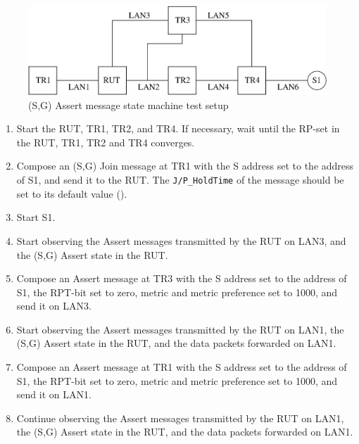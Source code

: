 \documentclass[11pt]{report}
\begin{document}
\begin{figure}[htbp]
  \begin{center}
    \includegraphics[scale=0.8]{figs/pim_test_5_1_sg_assert_message_state_machine}
    \caption{(S,G) Assert message state machine test setup}
    \label{fig:pim_test_5_1_sg_assert_message_state_machine}
  \end{center}
\end{figure}



\begin{enumerate}

  \item Start the RUT, TR1, TR2, and TR4. If necessary, wait until the RP-set
  in the RUT, TR1, TR2 and TR4 converges.

  \item Compose an (S,G) Join message at TR1 with the S address set to the
  address of S1, and send it to the RUT.
  The \verb=J/P_HoldTime= of the message should be set to its default
  value ({\PimsmJPHoldTime}).

  \item Start S1.

  \item Start observing the Assert messages transmitted by the RUT on
  LAN3, and the (S,G) Assert state in the RUT.

  \item Compose an Assert message at TR3 with the S address set to the
  address of S1, the RPT-bit set to zero, metric and metric preference set to
  1000, and send it on LAN3.

  \item Start observing the Assert messages transmitted by the RUT on
  LAN1, the (S,G) Assert state in the RUT, and the data packets forwarded on
  LAN1. 

  \item Compose an Assert message at TR1 with the S address set to the
  address of S1, the RPT-bit set to zero, metric and metric preference set to
  1000, and send it on LAN1.

  \item Continue observing the Assert messages transmitted by the RUT on
  LAN1, the (S,G) Assert state in the RUT, and the data packets forwarded on
  LAN1.

\end{enumerate}
\end{document}
